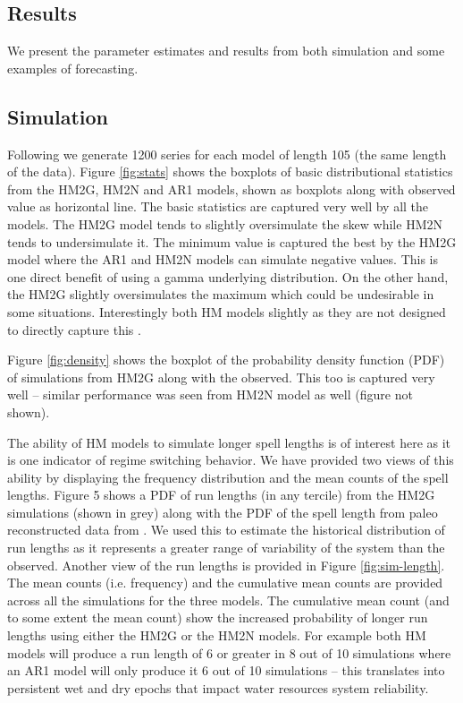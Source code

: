 \documentclass[wrr]{AGUTeX}
\begin{document}
\begin{article}
\section{Results}


We present the parameter estimates and results from both simulation and some examples of forecasting.  

\subsection{Simulation}

Following \cite{Guimaraes:2011tc} we generate 1200 series for each model of length 105 (the same length of the data).  Figure \ref{fig:stats} shows the boxplots of basic distributional statistics from the HM2G, HM2N and AR1 models, shown as boxplots along with observed value as horizontal line.  The basic statistics are captured very well by all the models. The HM2G model tends to slightly oversimulate the skew while HM2N tends to undersimulate it. The minimum value is captured the best by the HM2G model where the AR1 and HM2N models can simulate negative values.  This is one direct benefit of using a gamma underlying distribution. On the other hand, the HM2G slightly oversimulates the maximum which could be undesirable in some situations. Interestingly both HM models slightly as they are not designed to directly capture this .

Figure \ref{fig:density} shows the boxplot of the probability density function (PDF) of simulations from HM2G along with the observed.  This too is captured very well -- similar performance was seen from HM2N model as well (figure not shown).

The ability of HM models to simulate longer spell lengths is of interest here as it is one indicator of regime switching behavior. We have provided two views of this ability by displaying the frequency distribution and the mean counts of the spell lengths. Figure 5 shows a PDF of run lengths (in any tercile) from the HM2G simulations (shown in grey) along with the PDF of the spell length from paleo reconstructed data from \cite{Meko:2007bg}. We used this to estimate the historical distribution of run lengths as it represents a greater range of variability of the system than the observed. Another view of the run lengths is provided in Figure \ref{fig:sim-length}. The mean counts (i.e. frequency) and the cumulative mean counts are provided across all the simulations for the three models.  The cumulative mean count (and to some extent the mean count) show the increased probability of longer run lengths using either the HM2G or the HM2N models.  For example both HM models will produce a run length of 6 or greater in 8 out of 10 simulations where an AR1 model will only produce it 6 out of 10 simulations -- this translates into persistent wet and dry epochs that impact water resources system reliability.


\end{article}
\end{document}
